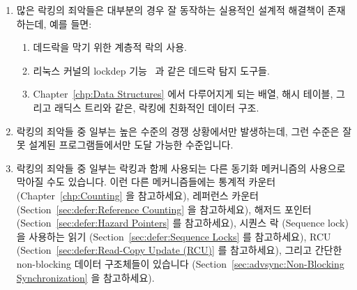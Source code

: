 \begin{enumerate}
\item	많은 락킹의 죄악들은 대부분의 경우 잘 동작하는 실용적인 설계적 해결책이
	존재하는데, 예를 들면:
	\begin{enumerate}
	\item	데드락을 막기 위한 계층적 락의 사용.
	\item	리눅스 커널의 lockdep 기능~\cite{JonathanCorbet2006lockdep} 과
		같은 데드락 탐지 도구들.
	\item	Chapter~\ref{chp:Data Structures} 에서 다루어지게 되는 배열,
		해시 테이블, 그리고 래딕스 트리와 같은, 락킹에 친화적인 데이터
		구조.
	\end{enumerate}
\item	락킹의 죄악들 중 일부는 높은 수준의 경쟁 상황에서만 발생하는데, 그런
	수준은 잘못 설계된 프로그램들에서만 도달 가능한 수준입니다.

\item	락킹의 죄악들 중 일부는 락킹과 함께 사용되는 다른 동기화 메커니즘의
	사용으로 막아질 수도 있습니다.
	이런 다른 메커니즘들에는 통계적 카운터
	(Chapter~\ref{chp:Counting} 을 참고하세요),
	레퍼런스 카운터
	(Section~\ref{sec:defer:Reference Counting} 을 참고하세요),
	해저드 포인터
	(Section~\ref{sec:defer:Hazard Pointers} 를 참고하세요),
	시퀀스 락 (Sequence lock)을 사용하는 읽기
	(Section~\ref{sec:defer:Sequence Locks} 를 참고하세요),
	RCU
	(Section~\ref{sec:defer:Read-Copy Update (RCU)} 를 참고하세요),
	그리고 간단한 non-blocking 데이터 구조체들이 있습니다
	(Section~\ref{sec:advsync:Non-Blocking Synchronization} 을 참고하세요).
\iffalse


\end{enumerate}

